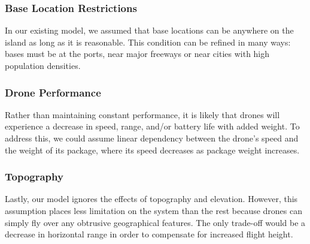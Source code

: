 \subsubsection{Base Location Restrictions}
In our existing model, we assumed that base locations can be anywhere on the island as long as it is reasonable. This condition can be refined in many ways: bases must be at the ports, near major freeways or near cities with high population densities. 

\subsubsection{Drone Performance}
Rather than maintaining constant performance, it is likely that drones will experience a decrease in speed, range, and/or battery life with added weight. To address this, we could assume linear dependency between the drone's speed and the weight of its package, where its speed decreases as package weight increases.

\subsubsection{Topography}
Lastly, our model ignores the effects of topography and elevation. However, this assumption places less limitation on the system than the rest because drones can simply fly over any obtrusive geographical features. The only trade-off would be a decrease in horizontal range in order to compensate for increased flight height.